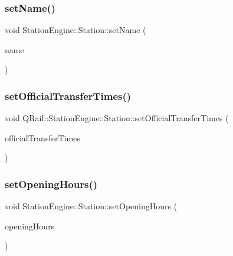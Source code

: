 \mbox{\label{classQRail_1_1StationEngine_1_1Station_aaa0f5a430b2d1ffd520285c2f00cea53}} 
\subsubsection{\texorpdfstring{setName()}{setName()}}
{\footnotesize\ttfamily void Station\+Engine\+::\+Station\+::set\+Name (\begin{DoxyParamCaption}\item[{const Q\+Map$<$ Q\+Locale\+::\+Language, Q\+String $>$ \&}]{name }\end{DoxyParamCaption})}

\mbox{\label{classQRail_1_1StationEngine_1_1Station_a1182f0a0ab0c0d3a168bb72389d108cb}} 
\subsubsection{\texorpdfstring{setOfficialTransferTimes()}{setOfficialTransferTimes()}}
{\footnotesize\ttfamily void Q\+Rail\+::\+Station\+Engine\+::\+Station\+::set\+Official\+Transfer\+Times (\begin{DoxyParamCaption}\item[{const quint32 \&}]{official\+Transfer\+Times }\end{DoxyParamCaption})}

\mbox{\label{classQRail_1_1StationEngine_1_1Station_a77c5ed806a41ad53afa4c03f96525bad}} 
\subsubsection{\texorpdfstring{setOpeningHours()}{setOpeningHours()}}
{\footnotesize\ttfamily void Station\+Engine\+::\+Station\+::set\+Opening\+Hours (\begin{DoxyParamCaption}\item[{const Q\+Map$<$ \mbox{\hyperlink{classQRail_1_1StationEngine_1_1Station_ae8c109a1d5ce2bb41959e62e32392631}{Station\+Engine\+::\+Station\+::\+Day}}, Q\+Pair$<$ Q\+Time, Q\+Time $>$ $>$ \&}]{opening\+Hours }\end{DoxyParamCaption})}

